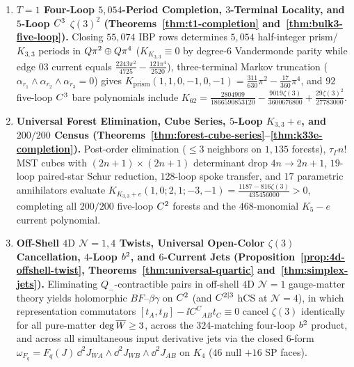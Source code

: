 \begin{enumerate}[label=\textbf{Result~\arabic*.},leftmargin=*]
  \item \textbf{$T=1$ Four-Loop $5{,}054$-Period Completion, $3$-Terminal Locality, and $5$-Loop $C^3$ $\zeta(3)^2$ (Theorems~\ref{thm:t1-completion} and~\ref{thm:bulk3-five-loop}).} Closing $55{,}074$ IBP rows determines $5{,}054$ half-integer prism/$K_{3,3}$ periods in $Q\pi^2\oplus Q\pi^4$ ($K_{K_{3,3}}\equiv 0$ by degree-$6$ Vandermonde parity while edge $03$ current equals $\frac{2243\pi^2}{4725}-\frac{121\pi^4}{2520}$), three-terminal Markov truncation ($\alpha_{r_1}\wedge\alpha_{r_2}\wedge\alpha_{r_3}=0$) gives $K_{\mathrm{prism}}(1,1,0,-1,0,-1) = \frac{311}{630}\pi^2 - \frac{17}{360}\pi^4$, and $92$ five-loop $C^3$ bare polynomials include $K_{62} = \frac{2804909}{1866590853120} - \frac{9019\zeta(3)}{3600676800} + \frac{29\zeta(3)^2}{27783000}$.

  \item \textbf{Universal Forest Elimination, Cube Series, $5$-Loop $K_{3,3}+e$, and $200/200$ Census (Theorems~\ref{thm:forest-cube-series}--\ref{thm:k33e-completion}).} Post-order elimination ($\le 3$ neighbors on $1{,}135$ forests), $\tau_\Gamma n!$ MST cubes with $(2n+1)\times(2n+1)$ determinant drop $4n \to 2n+1$, $19$-loop paired-star Schur reduction, $128$-loop spoke transfer, and $17$ parametric annihilators evaluate $K_{K_{3,3}+e}(1,0;2,1;-3,-1) = \frac{1187-816\zeta(3)}{435456000} > 0$, completing all $200/200$ five-loop $C^2$ forests and the $468$-monomial $K_5-e$ current polynomial.

  \item \textbf{Off-Shell $4\mathrm{D}$ $\mathcal{N}=1,4$ Twists, Universal Open-Color $\zeta(3)$ Cancellation, $4$-Loop $b^2$, and $6$-Current Jets (Proposition~\ref{prop:4d-offshell-twist}, Theorems~\ref{thm:universal-quartic} and~\ref{thm:simplex-jets}).} Eliminating $Q_-$-contractible pairs in off-shell $4\mathrm{D}$ $\mathcal{N}=1$ gauge-matter theory yields holomorphic $BF$--$\beta\gamma$ on $C^2$ (and $C^{2|3}$ hCS at $\mathcal{N}=4$), in which representation commutators $[t_A,t_B] - \ii C^C{}_{AB}t_C \equiv 0$ cancel $\zeta(3)$ identically for all pure-matter $\deg\overline{W} \ge 3$, across the $324$-matching four-loop $b^2$ product, and across all simultaneous input derivative jets via the closed $6$-form $\omega_{F_q} = F_q(J)\,\dd^2 J_{WA}\wedge\dd^2 J_{WB}\wedge\dd^2 J_{AB}$ on $K_4$ ($46$ null $+ 16$ SP faces).


\end{enumerate}

